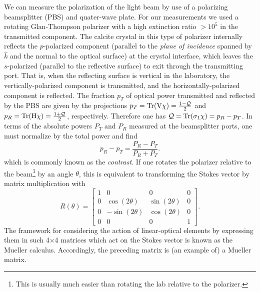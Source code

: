	We can measure the polarization of the light beam by use of a polarizing beamsplitter (PBS) and quater-wave plate.
	For our measurements we used a rotating Glan-Thompson polarizer with a high extinction ratio $>10^{5}$ in the transmitted component. 
	The calcite crystal in this type of polarizer internally reflects the $p$-polarized component (parallel to the \emph{plane of incidence} spanned by $\hat{k}$ and the normal to the optical surface) at the crystal interface, which leaves the $s$-polarized (parallel to the reflective surface) to exit through the transmitting port.
	That is, when the reflecting surface is vertical in the laboratory, the vertically-polarized component is transmitted, and the horizontally-polarized component is reflected.
	The fraction $p_T$ of optical power transmitted and reflected by the PBS are given by the projections $p_T=\textrm{Tr}(\mathrm{V}\chi)=\frac{1-\mathcal{Q}}{2}$ and $p_R=\textrm{Tr}(\mathrm{H}\chi)=\frac{1+\mathcal{Q}}{2}$, respectively. 
	Therefore one has $\mathcal{Q} = \textrm{Tr}(\sigma_1\chi) = p_R - p_T$. In terms of the absolute powers $P_T$ and $P_R$ measured at the beamsplitter ports, one must normalize by the total power and find 
	\begin{equation}
		p_R - p_T = \frac{P_R-P_T}{P_R+P_T}.
	\end{equation}
	which is commonly known as the \emph{contrast}.
	If one rotates the polarizer relative to the beam\footnote{This is usually much easier than rotating the lab relative to the polarizer.} by an angle $\theta$, this is equivalent to transforming the Stokes vector by matrix multiplication with
	\begin{equation}
		R(\theta) = \begin{bmatrix}
					1 & 0 & 0 & 0 \\
					0 & \cos(2\theta) & \sin(2\theta) & 0 \\
					0 & -\sin(2\theta) & \cos(2\theta) & 0 \\
					0 & 0 & 0 & 1
					\end{bmatrix}.
	\end{equation}
	The framework for considering the action of linear-optical elements by expressing them in such 4$\times$4 matrices which act on the Stokes vector is known as the Mueller calculus. Accordingly, the preceding matrix is (an example of) a Mueller matrix. 

